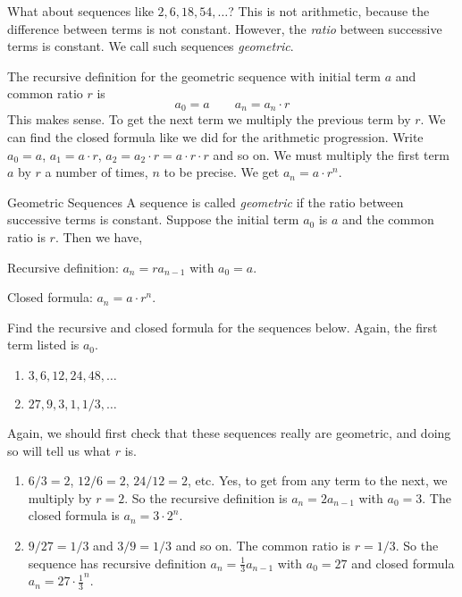 \documentclass[12pt]{article}
\begin{document}
What about sequences like $2, 6, 18, 54, \ldots$?  This is not arithmetic, because the difference between terms is not constant.  However, the {\em ratio} between successive terms is constant.  We call such sequences {\em geometric}.

The recursive definition for the geometric sequence with initial term $a$ and common ratio $r$ is 
\[a_0 = a \qquad a_n = a_{n}\cdot r \]
This makes sense.  To get the next term we multiply the previous term by $r$.  We can find the closed formula like we did for the arithmetic progression.  Write $a_0 = a$, $a_1 = a\cdot r$, $a_2 = a_2 \cdot r = a\cdot r \cdot r$ and so on.  We must multiply the first term $a$ by $r$ a number of times, $n$ to be precise.  We get $a_n = a\cdot r^{n}$.

\begin{defbox}{Geometric Sequences}
  A sequence is called {\em geometric} if the ratio between successive terms is constant.
  Suppose the initial term $a_0$ is $a$ and the common ratio is $r$.  Then we have,
  
  Recursive definition: $a_n = ra_{n-1}$ with $a_0 = a$.
  
  Closed formula: $a_n = a\cdot r^{n}$.
\end{defbox}


\begin{example}
  Find the recursive and closed formula for the sequences below.  Again, the first term listed is $a_0$.
  \begin{enumerate}
    \item $3, 6, 12, 24, 48, \ldots$
    \item $27, 9, 3, 1, 1/3, \ldots$
  \end{enumerate}
  \begin{solution}
    Again, we should first check that these sequences really are geometric, and doing so will tell us what $r$ is.
    \begin{enumerate}
      \item $6/3 = 2$, $12/6 = 2$, $24/12 = 2$, etc.  Yes, to get from any term to the next, we multiply by $r = 2$.  So the recursive definition is $a_n = 2a_{n-1}$ with $a_0 = 3$.  The closed formula is $a_n = 3\cdot 2^{n}$.
      \item $9/27 = 1/3$ and $3/9 = 1/3$ and so on.  The common ratio is $r = 1/3$.  So the sequence has recursive definition $a_n = \frac{1}{3}a_{n-1}$ with $a_0 = 27$ and closed formula $a_n = 27\cdot \frac{1}{3}^{n}$.
    \end{enumerate}
  \end{solution}
\end{example}
\end{document}
